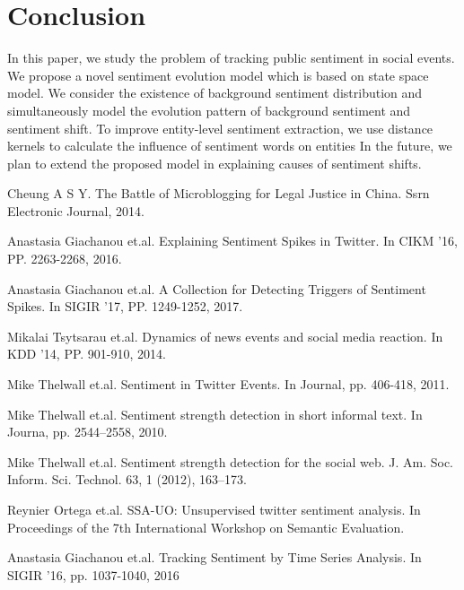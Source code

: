 \documentclass[runningheads]{llncs}
\begin{document}
\section{Conclusion}\label{sec:conclusion}
In this paper, we study the problem of tracking public sentiment in social events. We propose a novel sentiment evolution model which is based on state space model. We consider the existence of background sentiment distribution and simultaneously model the evolution pattern of background sentiment and sentiment shift. To improve entity-level sentiment extraction, we use distance kernels to calculate the influence of sentiment words on entities In the future, we plan to extend the proposed model in explaining causes of sentiment shifts.

\begin{thebibliography}{8}

Cheung A S Y. 
\newblock The Battle of Microblogging for Legal Justice in China. 
\newblock Ssrn Electronic Journal, 2014.

Anastasia Giachanou et.al.
\newblock  Explaining Sentiment Spikes in Twitter.
\newblock In CIKM ’16, PP. 2263-2268, 2016.

Anastasia Giachanou et.al.
\newblock  A Collection for Detecting Triggers of Sentiment Spikes.
\newblock In SIGIR ’17, PP. 1249-1252, 2017.

Mikalai Tsytsarau et.al.
\newblock  Dynamics of news events and social media reaction.
\newblock In KDD ’14, PP. 901-910, 2014.

Mike Thelwall et.al.
\newblock Sentiment in Twitter Events.
\newblock In Journal, pp. 406-418, 2011.

Mike Thelwall et.al.
\newblock Sentiment strength detection in short informal text.
\newblock In Journa, pp. 2544–2558, 2010.

Mike Thelwall et.al.
\newblock Sentiment strength detection for the social web.
\newblock J. Am. Soc. Inform. Sci. Technol. 63, 1 (2012), 163–173.

Reynier Ortega et.al.
\newblock SSA-UO: Unsupervised twitter sentiment analysis.
\newblock In Proceedings of the 7th International Workshop on Semantic Evaluation.

Anastasia Giachanou et.al.
\newblock Tracking Sentiment by Time Series Analysis.
\newblock In SIGIR ’16, pp. 1037-1040, 2016


\end{thebibliography}
\end{document}
